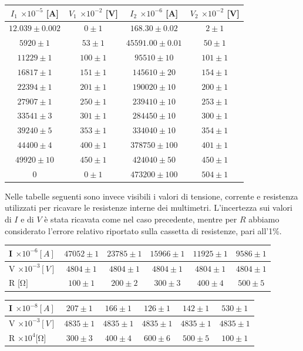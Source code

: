 \documentclass[a4paper]{article}
\begin{document}
\begin{center}
\begin{tabular}{|c|c|c|c|}
$I_1$ $\times 10^{-5}$ [A]& $V_1$ $\times 10^{-2}$ [V]& $I_2$ $\times 10^{-6}$ [A]& $V_2$ $\times 10^{-2}$ [V]\\
\hline
$12.039 \pm 0.002$ & $0 \pm 1$ & $168.30 \pm 0.02$ & $2 \pm 1$ \\
$5920 \pm 1$ & $53 \pm 1$ & $45591.00 \pm 0.01$ & $50 \pm 1$ \\
$11229 \pm 1$ & $100 \pm 1$ & $95510 \pm 10$ & $101 \pm 1$ \\
$16817 \pm 1$ & $151 \pm 1$ & $145610 \pm 20$ & $154 \pm 1$ \\
$22394 \pm 1$ & $201 \pm 1$ & $190020 \pm 10$ & $200 \pm 1$ \\
$27907 \pm 1$ & $250 \pm 1$ & $239410 \pm 10$ & $253 \pm 1$ \\
$33541 \pm 3$ & $301 \pm 1$ & $284450 \pm 10$ & $300 \pm 1$ \\
$39240 \pm 5$ & $353 \pm 1$ & $334040 \pm 10$ & $354 \pm 1$ \\
$44400 \pm 4$ & $400 \pm 1$ & $378750 \pm 100$ & $401 \pm 1$ \\
$49920 \pm 10$ & $450 \pm 1$ & $424040 \pm 50$ & $450 \pm 1$ \\
0 & $0 \pm 1$ & $473200 \pm 100$ & $504 \pm 1$ \\
\hline
\end{tabular}
\end{center}

Nelle tabelle seguenti sono invece visibili i valori di tensione, corrente e resistenza utilizzati per ricavare le resistenze interne dei multimetri.
L'incertezza sui valori di \(I\) e di \(V\) è stata ricavata come nel caso precedente, mentre per \(R\) abbiamo considerato l'errore relativo riportato sulla cassetta di resistenze, pari all'1\%.

\begin{center}
\begin{tabular}{|l|c c c c c|}
\hline
I $\times 10^{-6}[A]$ & $47052 \pm 1$ & $23785 \pm 1$ & $15966 \pm 1$ & $11925 \pm 1$ & $9586 \pm 1$ \\
\hline
V $\times 10^{-3}[V]$ & $4804 \pm 1$ & $4804 \pm 1$ & $4804 \pm 1$ & $4804 \pm 1$ & $4804 \pm 1$ \\
\hline
R [$\si{\ohm}]$ & $100 \pm 1$ & $200 \pm 2$ & $300 \pm 3$ & $400 \pm 4$ & $500 \pm 5$ \\
\hline
\end{tabular}
\vspace{10mm}
\begin{tabular}{|l|c c c c c|}
\hline
I $\times 10^{-8}[A]$ & $207 \pm 1$ & $166 \pm 1$ & $126 \pm 1$ & $142 \pm 1$ & $530 \pm 1$ \\
\hline
V $\times 10^{-3}[V]$ & $4835 \pm 1$ & $4835 \pm 1$ & $4835 \pm 1$ & $4835 \pm 1$ & $4835 \pm 1$ \\
\hline
R $\times 10^{4}[$\si{\ohm}] & $300 \pm 3$ & $400 \pm 4$ & $600 \pm 6$ & $500 \pm 5$ & $100 \pm 1$ \\
\hline
\end{tabular}
\end{center}
\end{document}
